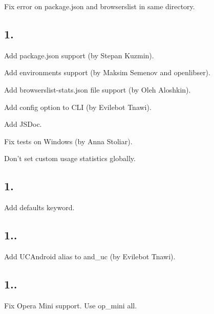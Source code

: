 \begin{DoxyItemize}
\item Fix error on {\ttfamily package.\+json} and {\ttfamily browserslist} in same directory.
\end{DoxyItemize}

\subsection*{1.}


\begin{DoxyItemize}
\item Add {\ttfamily package.\+json} support (by Stepan Kuzmin).
\item Add environments support (by Maksim Semenov and openlibser).
\item Add {\ttfamily browserslist-\/stats.\+json} file support (by Oleh Aloshkin).
\item Add {\ttfamily config} option to C\+LI (by Evilebot Tnawi).
\item Add J\+S\+Doc.
\item Fix tests on Windows (by Anna Stoliar).
\item Don’t set custom usage statistics globally.
\end{DoxyItemize}

\subsection*{1.}


\begin{DoxyItemize}
\item Add {\ttfamily defaults} keyword.
\end{DoxyItemize}

\subsection*{1..}


\begin{DoxyItemize}
\item Add {\ttfamily U\+C\+Android} alias to {\ttfamily and\+\_\+uc} (by Evilebot Tnawi).
\end{DoxyItemize}

\subsection*{1..}


\begin{DoxyItemize}
\item Fix Opera Mini support. Use {\ttfamily op\+\_\+mini all}.
\end{DoxyItemize}

